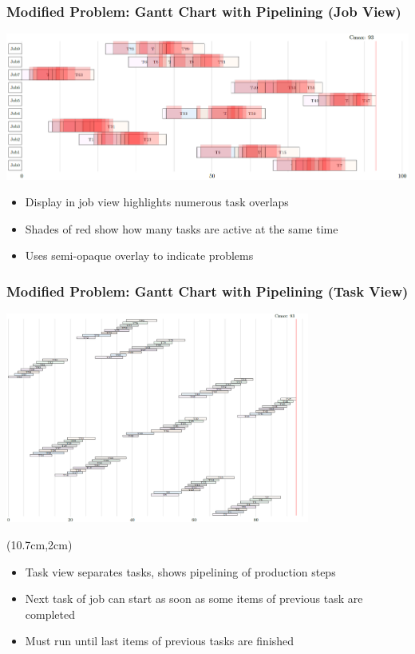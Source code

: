 \documentclass[dvipsnames,aspectratio=169]{beamer}
\begin{document}
\begin{frame}
  \frametitle{Modified Problem: Gantt Chart with Pipelining (Job View)}
  \includegraphics[width=13.5cm]{images/pipelinejobview}
  \begin{itemize}
      \item Display in job view highlights numerous task overlaps
      \item Shades of red show how many tasks are active at the same time
      \item Uses semi-opaque overlay to indicate problems
  \end{itemize}
\end{frame}

\begin{frame}
  \frametitle{Modified Problem: Gantt Chart with Pipelining (Task View)}
  \includegraphics[width=10cm]{images/pipelinetaskview}
  \begin{textblock*}{5cm}(10.7cm,2cm)
  \begin{itemize}
      \item Task view separates tasks, shows pipelining of production steps
      \item Next task of job can start as soon as some items of previous task are completed 
      \item Must run until last items of previous tasks are finished
  \end{itemize}
  \end{textblock*}
\end{frame}
\end{document}
